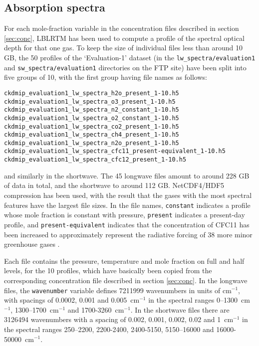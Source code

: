 \documentclass[twoside]{article}
\def\codesize{\small}
\def\code#1{{\codesize\texttt{#1}}}
\begin{document}
\subsection{Absorption spectra}
\label{sec:spectra}
For each mole-fraction variable in the concentration files described
in section \ref{sec:conc}, LBLRTM has been used to compute a profile
of the spectral optical depth for that one gas.  To keep the size of
individual files less than around 10 GB, the 50 profiles of the
`Evaluation-1' dataset (in the \code{lw\_spectra/evaluation1} and
\code{sw\_spectra/evaluation1} directories on the FTP site) have been
split into five groups of 10, with the first group having file names
as follows:
\begin{verbatim}
ckdmip_evaluation1_lw_spectra_h2o_present_1-10.h5
ckdmip_evaluation1_lw_spectra_o3_present_1-10.h5
ckdmip_evaluation1_lw_spectra_n2_constant_1-10.h5
ckdmip_evaluation1_lw_spectra_o2_constant_1-10.h5
ckdmip_evaluation1_lw_spectra_co2_present_1-10.h5
ckdmip_evaluation1_lw_spectra_ch4_present_1-10.h5
ckdmip_evaluation1_lw_spectra_n2o_present_1-10.h5
ckdmip_evaluation1_lw_spectra_cfc11_present-equivalent_1-10.h5
ckdmip_evaluation1_lw_spectra_cfc12_present_1-10.h5
\end{verbatim}
and similarly in the shortwave.  The 45 longwave files amount to
around 228 GB of data in total, and the shortwave to around 112 GB.
NetCDF4/HDF5 compression has been used, with the result that the gases
with the most spectral features have the largest file sizes. In the
file names, \code{constant} indicates a profile whose mole fraction is
constant with pressure, \code{present} indicates a present-day
profile, and \code{present-equivalent} indicates that the
concentration of CFC11 has been increased to approximately represent
the radiative forcing of 38 more minor greenhouse gases
\cite[]{Hogan+2020}.

Each file contains the pressure, temperature and mole fraction on full
and half levels, for the 10 profiles, which have basically been copied
from the corresponding concentration file described in section
\ref{sec:conc}.  In the longwave files, the \code{wavenumber} variable
defines 7211999 wavenumbers in units of cm$^{-1}$, with spacings of
0.0002, 0.001 and 0.005~cm$^{-1}$ in the spectral ranges
0--1300~cm$^{-1}$, 1300--1700~cm$^{-1}$ and 1700-3260~cm$^{-1}$.  In
the shortwave files there are 3126494 wavenumbers with a spacing of
0.002, 0.001, 0.002, 0.02 and 1~cm$^{-1}$ in the spectral ranges
250--2200, 2200-2400, 2400-5150, 5150--16000 and
16000-50000~cm$^{-1}$.
\end{document}
